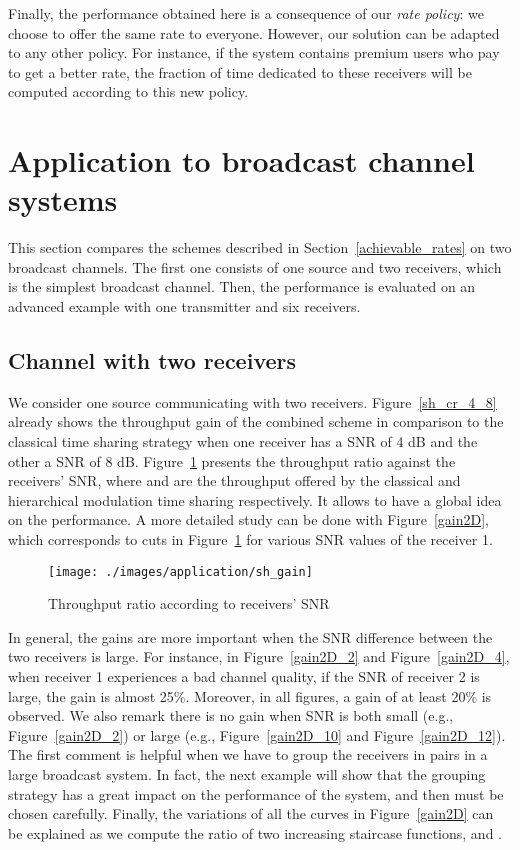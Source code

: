 \documentclass[conference, letterpaper]{IEEEtran}
\begin{document}
Finally, the performance obtained here is a consequence of our \emph{rate policy}: we choose to offer the same rate to everyone. However, our solution can be adapted to any other policy. For instance, if the system contains premium users who pay to get a better rate, the fraction of time dedicated to these receivers will be computed according to this new policy.



 \section{Application to broadcast channel systems}\label{application}

This section compares the schemes described in Section~\ref{achievable_rates} on two broadcast channels. The first one consists of one source and two receivers, which is the simplest broadcast channel. Then, the performance is evaluated on an advanced example with one transmitter and six receivers.


\subsection{Channel with two receivers}

We consider one source communicating with two receivers. Figure~\ref{sh_cr_4_8} already shows the throughput gain of the combined scheme in comparison to the classical time sharing strategy when one receiver has a SNR of 4 dB and the other a SNR of 8 dB. Figure~\ref{sh_gain} presents the throughput ratio  against the receivers' SNR, where  and  are the throughput offered by the classical and hierarchical modulation time sharing respectively. It allows to have a global idea on the performance. A more detailed study can be done with Figure~\ref{gain2D}, which corresponds to cuts in Figure~\ref{sh_gain} for various SNR values of the receiver 1.

\begin{figure}[!ht]
\centering
\texttt{[image: ./images/application/sh\_gain]}
\caption{Throughput ratio according to receivers' SNR}
\label{sh_gain}
\end{figure}

In general, the gains are more important when the SNR difference between the two receivers is large. For instance, in Figure~\ref{gain2D_2} and Figure~\ref{gain2D_4}, when receiver 1 experiences a bad channel quality, if the SNR of receiver 2 is large, the gain is almost 25\%. Moreover, in all figures, a gain of at least 20\% is observed. We also remark there is no gain when SNR is both small (e.g., Figure~\ref{gain2D_2}) or large (e.g., Figure~\ref{gain2D_10} and Figure~\ref{gain2D_12}). The first comment is helpful when we have to group the receivers in pairs in a large broadcast system. In fact, the next example will show that the grouping strategy has a great impact on the performance of the system, and then must be chosen carefully. Finally, the variations of all the curves in Figure~\ref{gain2D} can be explained as we compute the ratio of two increasing staircase functions,  and .
\end{document}
